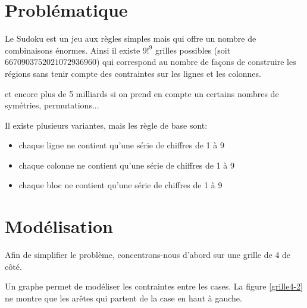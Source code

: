 \documentclass[a4paper,11pt]{article}
\begin{document}
\begin{Form}
\section{Problématique}
Le Sudoku est un jeu aux règles simples mais qui offre un nombre de combinaisons énormes. Ainsi il existe $9!^9$ grilles possibles (soit $6 670 903 752 021 072 936 960$) qui correspond au nombre de façons de construire les régions sans tenir compte des contraintes sur les lignes et les colonnes. 
\begin{commentprof}
et encore plus de 5 milliards si on prend en compte un certains nombres de symétries, permutations...
\end{commentprof}
Il existe plusieurs variantes, mais les règle de base sont:
\begin{itemize}
\item chaque ligne ne contient qu'une série de chiffres de 1 à 9
\item chaque colonne ne contient qu'une série de chiffres de 1 à 9
\item chaque bloc ne contient qu'une série de chiffres de 1 à 9
\end{itemize}
\begin{center}
\end{center}
\section{Modélisation}
Afin de simplifier le problème, concentrons-nous d'abord sur une grille de 4 de côté.
\begin{center}
\label{grille4}
\end{center}
Un graphe permet de modéliser les contraintes entre les cases. La figure \ref{grille4-2} ne montre que les arêtes qui partent de la case en haut à gauche. 
\begin{center}
\end{center}
\end{Form}
\end{document}
